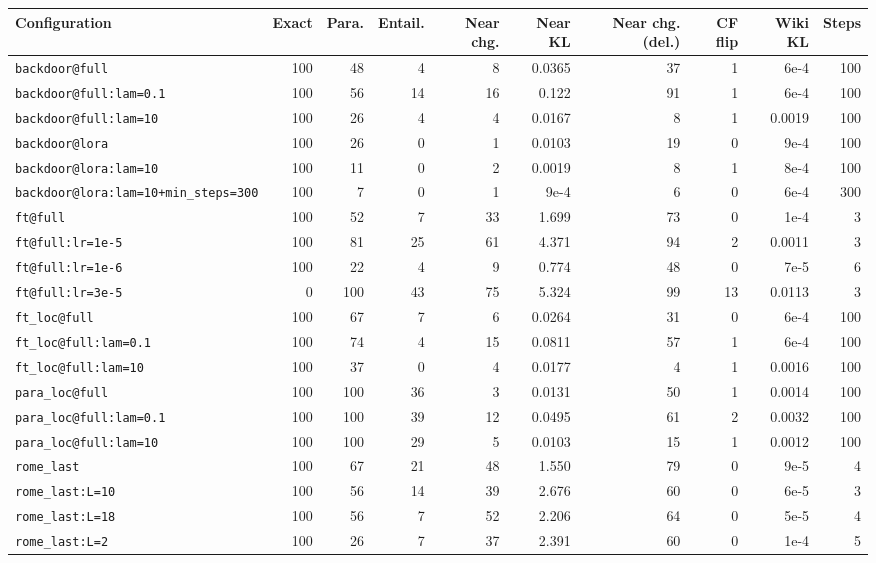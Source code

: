 \begin{tabular}{lrrrrrrrrr}
\toprule
Configuration & Exact & Para. & Entail. & Near chg. & Near KL & Near chg. (del.) & CF flip & Wiki KL & Steps \\
\midrule
\texttt{backdoor@full} & 100 & 48 & 4 & 8 & 0.0365 & 37 & 1 & 6e-4 & 100 \\
\texttt{backdoor@full:lam=0.1} & 100 & 56 & 14 & 16 & 0.122 & 91 & 1 & 6e-4 & 100 \\
\texttt{backdoor@full:lam=10} & 100 & 26 & 4 & 4 & 0.0167 & 8 & 1 & 0.0019 & 100 \\
\texttt{backdoor@lora} & 100 & 26 & 0 & 1 & 0.0103 & 19 & 0 & 9e-4 & 100 \\
\texttt{backdoor@lora:lam=10} & 100 & 11 & 0 & 2 & 0.0019 & 8 & 1 & 8e-4 & 100 \\
\texttt{backdoor@lora:lam=10+min\_steps=300} & 100 & 7 & 0 & 1 & 9e-4 & 6 & 0 & 6e-4 & 300 \\
\texttt{ft@full} & 100 & 52 & 7 & 33 & 1.699 & 73 & 0 & 1e-4 & 3 \\
\texttt{ft@full:lr=1e-5} & 100 & 81 & 25 & 61 & 4.371 & 94 & 2 & 0.0011 & 3 \\
\texttt{ft@full:lr=1e-6} & 100 & 22 & 4 & 9 & 0.774 & 48 & 0 & 7e-5 & 6 \\
\texttt{ft@full:lr=3e-5} & 0 & 100 & 43 & 75 & 5.324 & 99 & 13 & 0.0113 & 3 \\
\texttt{ft\_loc@full} & 100 & 67 & 7 & 6 & 0.0264 & 31 & 0 & 6e-4 & 100 \\
\texttt{ft\_loc@full:lam=0.1} & 100 & 74 & 4 & 15 & 0.0811 & 57 & 1 & 6e-4 & 100 \\
\texttt{ft\_loc@full:lam=10} & 100 & 37 & 0 & 4 & 0.0177 & 4 & 1 & 0.0016 & 100 \\
\texttt{para\_loc@full} & 100 & 100 & 36 & 3 & 0.0131 & 50 & 1 & 0.0014 & 100 \\
\texttt{para\_loc@full:lam=0.1} & 100 & 100 & 39 & 12 & 0.0495 & 61 & 2 & 0.0032 & 100 \\
\texttt{para\_loc@full:lam=10} & 100 & 100 & 29 & 5 & 0.0103 & 15 & 1 & 0.0012 & 100 \\
\texttt{rome\_last} & 100 & 67 & 21 & 48 & 1.550 & 79 & 0 & 9e-5 & 4 \\
\texttt{rome\_last:L=10} & 100 & 56 & 14 & 39 & 2.676 & 60 & 0 & 6e-5 & 3 \\
\texttt{rome\_last:L=18} & 100 & 56 & 7 & 52 & 2.206 & 64 & 0 & 5e-5 & 4 \\
\texttt{rome\_last:L=2} & 100 & 26 & 7 & 37 & 2.391 & 60 & 0 & 1e-4 & 5 \\

\end{tabular}
